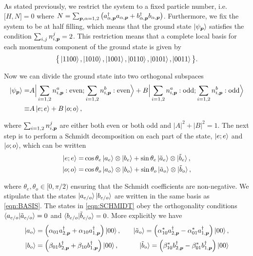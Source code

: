 As stated previously, we restrict the system to a fixed particle number, i.e. $\big[H,N\big]=0$ where $N=\sum_{\boldsymbol{p},\alpha=1,2}\big(a^{\dagger}_{\alpha,\boldsymbol{p}}a_{\alpha,\boldsymbol{p}}+b^{\dagger}_{\alpha,\boldsymbol{p}}b_{\alpha,\boldsymbol{p}}\big)$. Furthermore, we fix the system to be at half filling, which means that the ground state $\ket{\psi_{\boldsymbol{p}}}$ satisfies the condition $\sum_{i,j}n^{j}_{i,\boldsymbol{p}}=2$. This restriction means that a complete local basis for each momentum component of the ground state is given by
\begin{equation}
    \big\{\ket{1100},\ket{1010},\ket{1001},\ket{0110},\ket{0101},\ket{0011}\big\}.
\end{equation}

\noi Now we can divide the ground state into two orthogonal subspaces
\begin{align}
    \ket{\psi_{\boldsymbol{p}}}=&A\Big|\sum_{i=1,2}n^{a}_{i,\boldsymbol{p}}:\text{even};\sum_{i=1,2}n^{b}_{i,\boldsymbol{p}}:\text{even}\Big> +B\Big|\sum_{i=1,2}n^{a}_{i,\boldsymbol{p}}:\text{odd};\sum_{i=1,2}n^{b}_{i,\boldsymbol{p}}:\text{odd}\Big>\nonumber\\
    \equiv&A\ket{e;e}+B\ket{o;o},
\end{align}

\noi where $\sum_{i=1,2}n^{j}_{i,\boldsymbol{p}}$ are either both even or both odd and $|A|^{2}+|B|^{2}=1$. The next step is to perform a Schmidt decomposition on each part of the state, $\ket{e;e}$ and $\ket{o;o}$, which can be written
\begin{align}\label{eqn:SCHMIDT}
    \ket{e;e}=&\cos\theta_{e}\ket{a_{e}}\otimes\ket{b_{e}} + \sin\theta_{e}\ket{\tilde{a}_{e}}\otimes\ket{\tilde{b}_{e}},\nonumber\\
    \ket{o;o}=&\cos\theta_{o}\ket{a_{o}}\otimes\ket{b_{o}} + \sin\theta_{o}\ket{\tilde{a}_{o}}\otimes\ket{\tilde{b}_{o}},
\end{align}

\noi where $\theta_{e},\theta_{o}\in[0,\pi/2)$ ensuring that the Schmidt coefficients are non-negative. We stipulate that the states $\ket{a_{e/o}}\ket{b_{e/o}}$ are written in the same basis as \eqref{eqn:BASIS}. The states in \eqref{eqn:SCHMIDT} obey the orthogonality conditions $\braket{a_{e/o}|\tilde{a}_{e/o}}=0$ and $\braket{b_{e/o}|\tilde{b}_{e/o}}=0$. More explicitly we have
\begin{align}\label{subsystems}
\ket{a_{o}}&=\left(\alpha_{01}a^{\dagger}_{2,\boldsymbol{p}}+\alpha_{10}a^{\dagger}_{1,\boldsymbol{p}}\right)\ket{00}, \quad &\ket{\tilde{a}_{o}}=\left(\alpha^{*}_{10}a^{\dagger}_{2,\boldsymbol{p}}-\alpha^{*}_{01}a^{\dagger}_{1,\boldsymbol{p}}\right)\ket{00},\nonumber\\
\ket{b_{o}}&=\left(\beta_{01}b^{\dagger}_{2,\boldsymbol{p}}+\beta_{10}b^{\dagger}_{1,\boldsymbol{p}}\right)\ket{00}, \quad &\ket{\tilde{b}_{o}}=\left(\beta^{*}_{10}b^{\dagger}_{2,\boldsymbol{p}}-\beta^{*}_{01}b^{\dagger}_{1,\boldsymbol{p}}\right)\ket{00}
\end{align}

